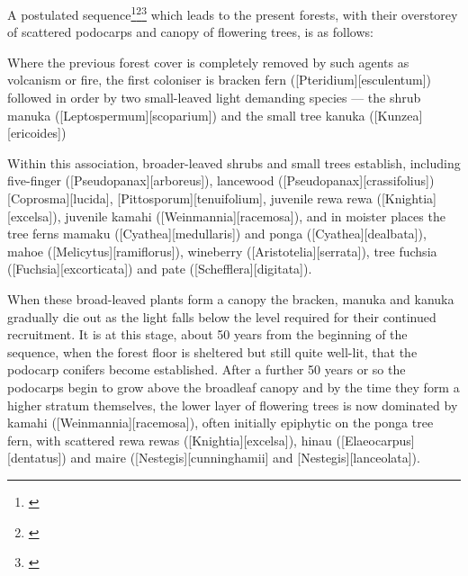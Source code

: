 A postulated sequence\footnote{\cite{cockayne1928vegetation}}\footnote{\cite{mckelvey1963synecology}}\footnote{\cite{mckelvey1973pattern}} which leads to the present forests, with their overstorey of scattered podocarps and canopy of flowering trees, is as follows:

Where the previous forest cover is completely removed by such agents as volcanism or fire, the first coloniser is bracken fern ([Pteridium][esculentum]) followed in order by two small-leaved light demanding species --- the shrub manuka ([Leptospermum][scoparium]) and the small tree kanuka ([Kunzea][ericoides])

Within this association, broader-leaved shrubs and small trees establish, including five-finger ([Pseudopanax][arboreus]), lancewood ([Pseudopanax][crassifolius]) [Coprosma][lucida], [Pittosporum][tenuifolium], juvenile rewa rewa ([Knightia][excelsa]), juvenile kamahi ([Weinmannia][racemosa]), and in moister places the tree ferns mamaku ([Cyathea][medullaris]) and ponga ([Cyathea][dealbata]), mahoe ([Melicytus][ramiflorus]), wineberry ([Aristotelia][serrata]), tree fuchsia ([Fuchsia][excorticata]) and pate ([Schefflera][digitata]).

When these broad-leaved plants form a canopy the bracken, manuka and kanuka gradually die out as the light falls below the level required for their continued recruitment.
It is at this stage, about 50 years from the beginning of the sequence, when the forest floor is sheltered but still quite well-lit, that the podocarp conifers become established.
After a further 50 years or so the podocarps begin to grow above the broadleaf canopy and by the time they form a higher stratum themselves, the lower layer of flowering trees is now dominated by kamahi ([Weinmannia][racemosa]), often initially epiphytic on the ponga tree fern, with scattered rewa rewas ([Knightia][excelsa]), hinau ([Elaeocarpus][dentatus]) and maire ([Nestegis][cunninghamii] and [Nestegis][lanceolata]).

